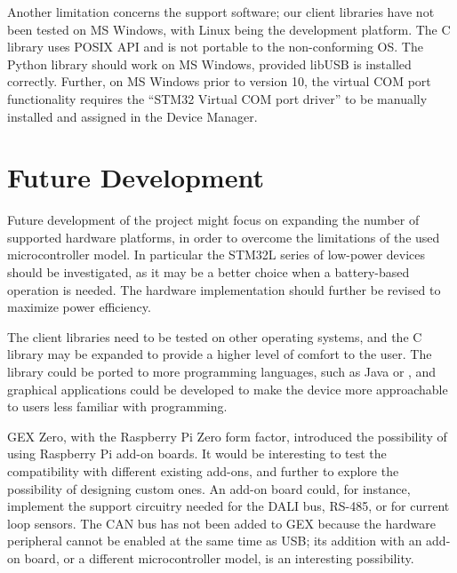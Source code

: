Another limitation concerns the support software; our client libraries have not been tested on MS Windows, with Linux being the development platform. The C library uses POSIX \gls{API} and is not portable to the non-conforming \gls{OS}. The Python library should work on MS Windows, provided libUSB is installed correctly. Further, on MS Windows prior to version 10, the virtual COM port functionality requires the ``STM32 Virtual COM port driver'' to be manually installed and assigned in the Device Manager. 

\section{Future Development}

Future development of the project might focus on expanding the number of supported hardware platforms, in order to overcome the limitations of the used microcontroller model. In particular the STM32L series of low-power devices should be investigated, as it may be a better choice when a battery-based operation is needed. The hardware implementation should further be revised to maximize power efficiency.

The client libraries need to be tested on other operating systems, and the C library may be expanded to provide a higher level of comfort to the user. The library could be ported to more programming languages, such as Java or \CS, and graphical applications could be developed to make the device more approachable to users less familiar with programming.

GEX Zero, with the Raspberry Pi Zero form factor, introduced the possibility of using Raspberry Pi add-on boards. It would be interesting to test the compatibility with different existing add-ons, and further to explore the possibility of designing custom ones. An add-on board could, for instance, implement the support circuitry needed for the \gls{DALI} bus, RS-485, or for current loop sensors. The \gls{CAN} bus has not been added to GEX because the hardware peripheral cannot be enabled at the same time as \gls{USB}; its addition with an add-on board, or a different microcontroller model, is an interesting possibility.





